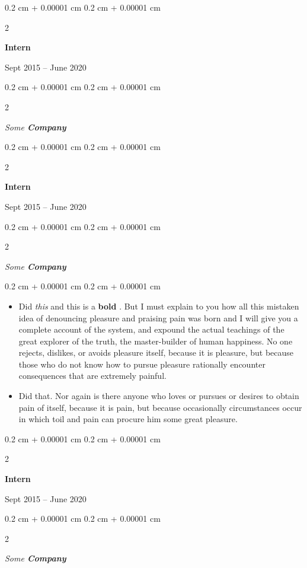 \documentclass[10pt, letterpaper]{article}
\newenvironment{highlights}{
    \begin{itemize}[
        topsep=0.10 cm,
        parsep=0.10 cm,
        partopsep=0pt,
        itemsep=0pt,
        leftmargin=0.4 cm + 10pt
    ]
}{
    \end{itemize}
} %
\newenvironment{onecolentry}{
    \begin{adjustwidth}{
        0.2 cm + 0.00001 cm
    }{
        0.2 cm + 0.00001 cm
    }
}{
    \end{adjustwidth}
} %
\newenvironment{twocolentry}[2][]{
    \onecolentry
    \def\secondColumn{#2}
    \setcolumnwidth{\fill, 4.5 cm}
    \begin{paracol}{2}
}{
    \switchcolumn \raggedleft \secondColumn
    \end{paracol}
    \endonecolentry
} %
\let\hrefWithoutArrow\href
\renewcommand{\href}[2]{\hrefWithoutArrow{#1}{\ifthenelse{\equal{#2}{}}{ }{#2 }\raisebox{.15ex}{\footnotesize \faExternalLink*}}}
\begin{document}
        \vspace{0.2 cm}

                \begin{twocolentry}{
                    Sept 2015 – June 2020
                }
                \textbf{Intern}
                \end{twocolentry}
            \begin{twocolentry}{
            }
            \textit{Some \textbf{Company}}
            \end{twocolentry}



        \vspace{0.2 cm}

                \begin{twocolentry}{
                    Sept 2015 – June 2020
                }
                \textbf{Intern}
                \end{twocolentry}
            \begin{twocolentry}{
            }
            \textit{Some \textbf{Company}}
            \end{twocolentry}

        \vspace{0.10 cm}
        \begin{onecolentry}
            \begin{highlights}
                \item Did \textit{this} and this is a \textbf{bold} \href{https://example.com}{link}. But I must explain to you how all this mistaken idea of denouncing pleasure and praising pain was born and I will give you a complete account of the system, and expound the actual teachings of the great explorer of the truth, the master-builder of human happiness. No one rejects, dislikes, or avoids pleasure itself, because it is pleasure, but because those who do not know how to pursue pleasure rationally encounter consequences that are extremely painful.
                \item Did that. Nor again is there anyone who loves or pursues or desires to obtain pain of itself, because it is pain, but because occasionally circumstances occur in which toil and pain can procure him some great pleasure.
            \end{highlights}
        \end{onecolentry}


        \vspace{0.2 cm}

                \begin{twocolentry}{
                    Sept 2015 – June 2020
                }
                \textbf{Intern}
                \end{twocolentry}
            \begin{twocolentry}{
            }
            \textit{Some \textbf{Company}}
            \end{twocolentry}
\end{document}
